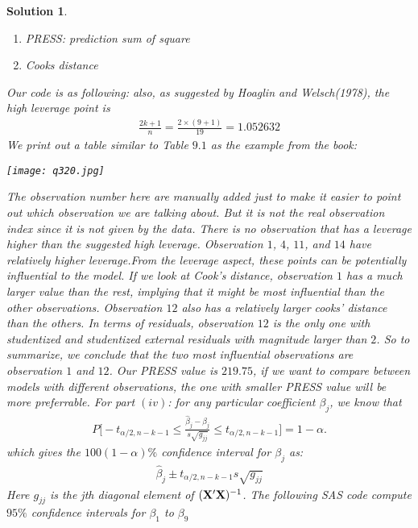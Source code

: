 \documentclass[11pt]{article}
\newtheorem{sol}{Solution}
\begin{document}
\begin{sol}
\begin{enumerate}
		\item PRESS: prediction sum of square
		\item Cooks distance
	\end{enumerate}
	Our code is as following:
	also, as suggested by Hoaglin and Welsch(1978), the high leverage point is
	\begin{align*}
		\frac{2k + 1}{n} = \frac{2 \times (9 + 1)}{19} = 1.052632
	\end{align*}
	We print out a table similar to Table $9.1$ as the example from the book:
	\begin{center}
		\texttt{[image: q320.jpg]}
	\end{center}
	The observation number here are manually added just to make it easier to point out which observation we are talking about. But it is not the real observation index since it is not given by the data.\vskip 2mm
	There is no observation that has a leverage higher than the suggested high leverage. Observation $1$, $4$, $11$, and $14$ have relatively higher leverage.From the leverage aspect, these points can be potentially influential to the model.\vskip 2mm
	If we look at Cook's distance, observation $1$ has a much larger value than the rest, implying that it might be most influential than the other observations. Observation $12$ also has a relatively larger cooks' distance than the others.\vskip 2mm
	In terms of residuals, observation $12$ is the only one with studentized and studentized external residuals with magnitude larger than $2$.\vskip 2mm
	So to summarize, we conclude that the two most influential observations are observation $1$ and $12$.\vskip 2mm
	Our PRESS value is $219.75$, if we want to compare between models with different observations, the one with smaller PRESS value will be more preferrable.\vskip 2mm
	For  part $(iv)$:\vskip 2mm
	for any particular coefficient $\beta_j$, we know that
	\begin{align*}
		P\Big[-t_{\alpha/2, n - k - 1} \leq \frac{\hat{\beta}_j - \beta_j}{s\sqrt{g_{jj}}} \leq t_{\alpha/2, n - k - 1}\Big] = 1 - \alpha.
	\end{align*}
	which gives the $100(1 - \alpha)\%$ confidence interval for $\beta_j$ as:
	\begin{align*}
		\hat{\beta}_j \pm t_{\alpha/2, n -  k- 1}s\sqrt{g_{jj}}
	\end{align*}
	Here $g_{jj}$ is the jth diagonal element of $({\bf X}'{\bf X})^{-1}$.\vskip 2mm
	The following SAS code compute $95\%$ confidence intervals for $\beta_1$ to $\beta_9$
	\begin{center}

\end{center}
\end{sol}
\end{document}
